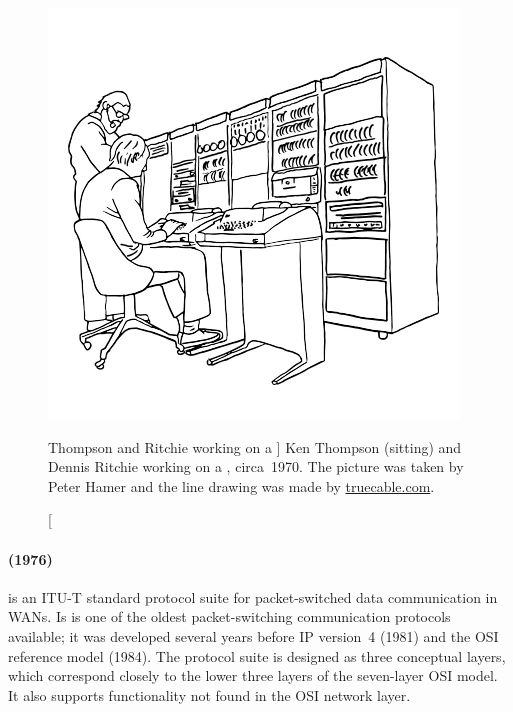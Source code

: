 {\begin{figure}
\centering
\includegraphics{images/thompson.png}
\caption%
   [Thompson and Ritchie working on a ]%
   {Ken Thompson (sitting) and Dennis Ritchie working on a , circa~1970. The picture was taken by Peter Hamer and the line drawing was made by \href{https://www.truecable.com/blogs/cable-academy/a-brief-history-of-network-technology}{truecable.com}.}
\label{fig:thompson}
\end{figure}

\paragraph{ (1976)}%
 is an \acs{ITU-T} standard protocol suite for packet-switched data communication in \aclp{WAN}.
Is is one of the oldest packet-switching communication protocols available; it was developed several years before \gls{IP} version~4 (1981) and the \gls{OSI} reference model (1984).
The protocol suite is designed as three conceptual layers, which correspond closely to the lower three layers of the seven-layer \gls{OSI} model.
It also supports functionality not found in the \gls{OSI} network layer.

}
